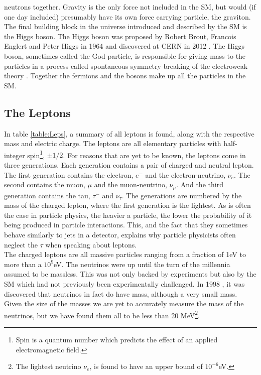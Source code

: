 neutrons together. Gravity is the only force not included in the SM, but would (if one day included)
presumably have its own force carrying particle, the graviton. 
\\
The final building block in the universe introduced and described by the \ac{SM} is the Higgs boson. The Higgs boson was 
proposed by Robert Brout, Francois Englert and Peter Higgs in 1964 and discovered at CERN in 2012 \cite{Aad_2012,the_cms_collaboration_observation_2012}. 
The Higgs boson, sometimes called the God particle, is responsible for giving mass to the particles in a process called
spontaneous symmetry breaking of the electroweak theory \cite{SSB}. Together the fermions and the bosons make up all the 
particles in the \ac{SM}.
\subsection{The Leptons} 
In table \ref{table:Leps}, a summary of all leptons is found, along with the respective mass and electric charge.  
The leptons are all elementary particles with half-integer spin\footnote{Spin is a quantum number
which predicts the effect of an applied electromagnetic field.}, $\pm 1/2$. For reasons that are yet to be known, the 
leptons come in three generations. Each generation contains a pair of charged and neutral lepton. The first generation contains the
electron, $e^-$ and the electron-neutrino, $\nu_e$. The second contains the muon, $\mu$ and the
muon-neutrino, $\nu_\mu$. And the third generation contains the tau, $\tau^-$ and $\nu_\tau$. The generations
are numbered by the mass of the charged lepton, where the first generation is the lightest. As is often the case
in particle physics, the heavier a particle, the lower the probability of it being produced in particle interactions. 
This, and the fact that they sometimes behave similarly to jets in a detector, explains why particle physicists often neglect 
the $\tau$ when speaking about leptons.
\\
The charged leptons are all massive particles ranging from a fraction of 1eV to more than a $10^9$eV.
The neutrinos were up until the turn of the millennia assumed to be massless. This was not only backed by experiments
but also by the \ac{SM} which had not previously been experimentally challenged. In 1998 \cite{NeutrinoMass}, it was discovered 
that neutrinos in fact do have mass, although a very small mass. Given the size of the masses we are yet to accurately measure 
the mass of the neutrinos, but we have found them all to be less than 20 MeV\footnote{The lightest neutrino $\nu_e$, is found to 
have an upper bound of $10^{-6}$eV.}.
